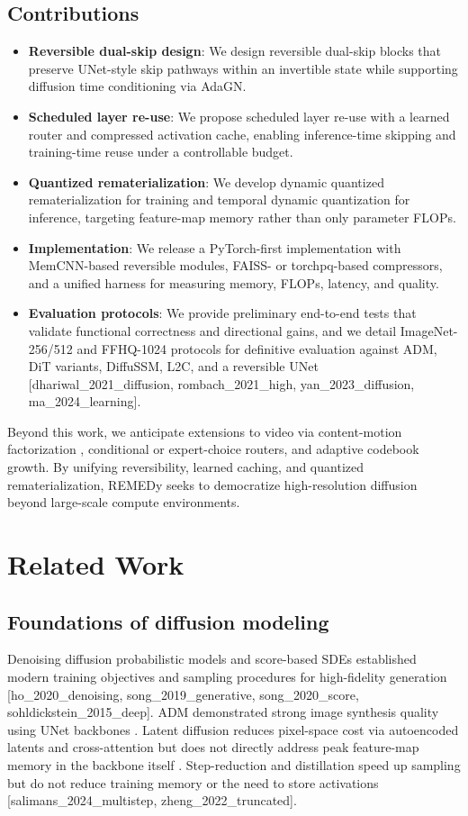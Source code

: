 \documentclass{article}
\begin{document}
\subsection{Contributions}
\begin{itemize}
  \item \textbf{Reversible dual-skip design}: We design reversible dual-skip blocks that preserve UNet-style skip pathways within an invertible state while supporting diffusion time conditioning via AdaGN.
  \item \textbf{Scheduled layer re-use}: We propose scheduled layer re-use with a learned router and compressed activation cache, enabling inference-time skipping and training-time reuse under a controllable budget.
  \item \textbf{Quantized rematerialization}: We develop dynamic quantized rematerialization for training and temporal dynamic quantization for inference, targeting feature-map memory rather than only parameter FLOPs.
  \item \textbf{Implementation}: We release a PyTorch-first implementation with MemCNN-based reversible modules, FAISS- or torchpq-based compressors, and a unified harness for measuring memory, FLOPs, latency, and quality.
  \item \textbf{Evaluation protocols}: We provide preliminary end-to-end tests that validate functional correctness and directional gains, and we detail ImageNet-256/512 and FFHQ-1024 protocols for definitive evaluation against ADM, DiT variants, DiffuSSM, L2C, and a reversible UNet [dhariwal_2021_diffusion, rombach_2021_high, yan_2023_diffusion, ma_2024_learning].
\end{itemize}

Beyond this work, we anticipate extensions to video via content-motion factorization \cite{yu_2024_efficient}, conditional or expert-choice routers, and adaptive codebook growth. By unifying reversibility, learned caching, and quantized rematerialization, REMEDy seeks to democratize high-resolution diffusion beyond large-scale compute environments.

\section{Related Work}
\subsection{Foundations of diffusion modeling}
Denoising diffusion probabilistic models and score-based SDEs established modern training objectives and sampling procedures for high-fidelity generation [ho_2020_denoising, song_2019_generative, song_2020_score, sohldickstein_2015_deep]. ADM demonstrated strong image synthesis quality using UNet backbones \cite{dhariwal_2021_diffusion}. Latent diffusion reduces pixel-space cost via autoencoded latents and cross-attention but does not directly address peak feature-map memory in the backbone itself \cite{rombach_2021_high}. Step-reduction and distillation speed up sampling but do not reduce training memory or the need to store activations [salimans_2024_multistep, zheng_2022_truncated].
\end{document}
